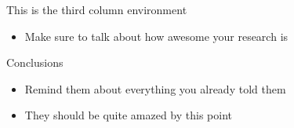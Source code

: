\documentclass[final, usenames, dvipsnames]{beamer}
\newlength{\onecolwidth}
\begin{document}
\begin{frame}[t]
\begin{columns}[T,onlytextwidth]
\begin{column}{\onecolwidth} %

\begin{block}{This is the third column environment} %
	\begin{itemize}
		\item Make sure to talk about how awesome your research is
	\end{itemize}
\end{block} %

\begin{block}{Conclusions} %
	\begin{itemize}
		\item Remind them about everything you already told them
		\item They should be quite amazed by this point
	\end{itemize}
\end{block} %
\end{column}  %

\end{columns} %
\end{frame} %
\end{document}
